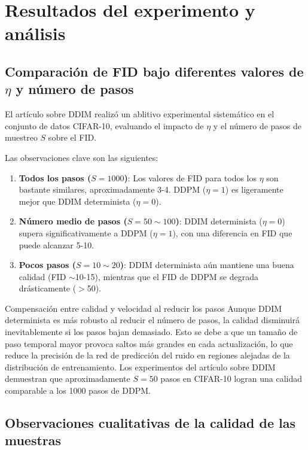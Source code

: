 \section{Resultados del experimento y análisis}

\subsection{Comparación de FID bajo diferentes valores de $\eta$ y número de pasos}

El artículo sobre DDIM realizó un ablitivo experimental sistemático en el conjunto de datos CIFAR-10, evaluando el impacto de $\eta$ y el número de pasos de muestreo $S$ sobre el FID.

Las observaciones clave son las siguientes:

\begin{enumerate}
    \item \textbf{Todos los pasos ($S=1000$)}: Los valores de FID para todos los $\eta$ son bastante similares, aproximadamente 3-4. DDPM ($\eta=1$) es ligeramente mejor que DDIM determinista ($\eta=0$).
    \item \textbf{Número medio de pasos ($S=50\sim100$)}: DDIM determinista ($\eta=0$) supera significativamente a DDPM ($\eta=1$), con una diferencia en FID que puede alcanzar 5-10.
    \item \textbf{Pocos pasos ($S=10\sim20$)}: DDIM determinista aún mantiene una buena calidad (FID $\sim$10-15), mientras que el FID de DDPM se degrada drásticamente ($>$50).
\end{enumerate}

\begin{warningbox}{Compensación entre calidad y velocidad al reducir los pasos}
Aunque DDIM determinista es más robusto al reducir el número de pasos, la calidad disminuirá inevitablemente si los pasos bajan demasiado. Esto se debe a que un tamaño de paso temporal mayor provoca saltos más grandes en cada actualización, lo que reduce la precisión de la red de predicción del ruido en regiones alejadas de la distribución de entrenamiento. Los experimentos del artículo sobre DDIM demuestran que aproximadamente $S=50$ pasos en CIFAR-10 logran una calidad comparable a los 1000 pasos de DDPM.
\end{warningbox}

\subsection{Observaciones cualitativas de la calidad de las muestras}

